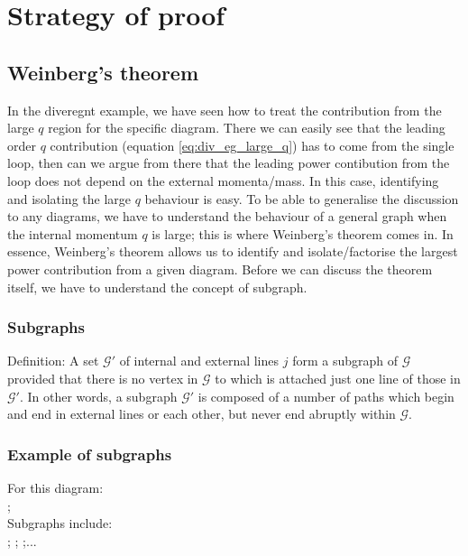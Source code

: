 \documentclass{scrartcl}
\begin{document}
\section{Strategy of proof}
\subsection{Weinberg's theorem}
In the diveregnt example, we have seen how to treat the contribution from the large $q$ region for the specific diagram. There we can easily see that the leading order $q$ contribution (equation \ref{eq:div_eg_large_q}) has to come from the single loop, then can we argue from there that the leading power contibution from the loop does not depend on the external momenta/mass. In this case, identifying and isolating the large $q$ behaviour is easy. To be able to generalise the discussion to any diagrams, we have to understand the behaviour of a general graph when the internal momentum $q$ is large; this is where Weinberg's theorem \cite{weinberg} comes in. In essence, Weinberg's theorem allows us to identify and isolate/factorise the largest power contribution from a given diagram. Before we can discuss the theorem itself, we have to understand the concept of subgraph.\\



\subsubsection{Subgraphs}
Definition: A set $\mathcal{G'}$ of internal and external lines $j$ form a subgraph of $\mathcal{G}$ provided that there is no vertex in $\mathcal{G}$ to which is attached just one line of those in $\mathcal{G'}$. In other words, a subgraph $\mathcal{G'}$ is composed of a number of paths which begin and end in external lines or each other, but never end abruptly within $\mathcal{G}$. 

\subsubsection{Example of subgraphs}
For this diagram:\\
;\\
Subgraphs include:\\
;
;
;...\\
\end{document}
